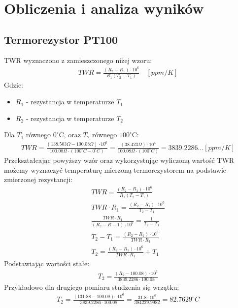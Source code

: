 \documentclass[11pt]{article}
\begin{document}
    \section{Obliczenia i analiza wyników}
    \subsection{Termorezystor PT100}
    TWR wyznaczono z zamieszczonego niżej wzoru:
    \begin{gather*}
        TWR=\frac{(R_2-R_1)\cdot 10^6}{R_1(T_2-T_1)}\quad [ppm/K]
    \end{gather*}
    \indent Gdzie:
        {\footnotesize
    \begin{itemize}
        \setlength\itemsep{0em}
        \item[] \textbf{$R_1$} - rezystancja w temperaturze $T_1$
        \item[] \textbf{$R_2$} - rezystancja w temperaturze $T_2$
    \end{itemize}}
    Dla $T_1$ równego $0^{\circ}$C, oraz $T_2$ równego $100^{\circ}$C:
    \begin{gather*}
        TWR=\frac{(138.503\Omega-100.08\Omega)\cdot 10^6}{100.08\Omega\cdot(100^{\circ} C-0^{\circ}C)}=\frac{(38.423\Omega)\cdot 10^6}{100.08\Omega\cdot(100^{\circ}C)}=3839.2286\dots[ppm/K]
    \end{gather*}
    \indent Przekształcając powyższy wzór oraz wykorzystując wyliczoną wartość TWR możemy wyznaczyć temperaturę mierzoną termorezystorem na podstawie zmierzonej rezystancji:
    \setlength{\jot}{10}
    \begin{gather*}
        TWR=\frac{(R_2-R_1)\cdot 10^6}{R_1(T_2-T_1)} \\
        TWR\cdot R_1=\frac{(R_2-R_1)\cdot 10^6}{T_2-T_1} \\
        \frac{TWR\cdot R_1}{(R_2-R-1)\cdot 10^6}=\frac{1}{T_2-T_1} \\
        T_2-T_1=\frac{(R_2-R_1)\cdot 10^6}{TWR\cdot R_1}\\
        T_2=\frac{(R_2-R_1)\cdot 10^6}{TWR\cdot R_1}+T_1
    \end{gather*}
    Podstawiając wartości stałe:
    \begin{gather*}
        T_2=\frac{(R_2-100.08)\cdot 10^6}{3839.2286\cdot 100.08}
    \end{gather*}
    Przykładowo dla drugiego pomiaru studzenia się wrzątku:
    \begin{gather*}
        T_2=\frac{(131.88-100.08)\cdot 10^6}{3839.2286\cdot 100.08}=\frac{31.8\cdot 10^6}{384229.9982}=82.7629^{\circ}C
    \end{gather*}
\end{document}
